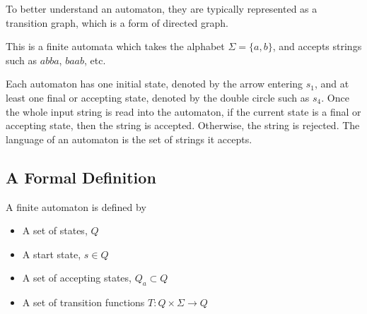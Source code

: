 To better understand an automaton, they are typically represented as a transition graph, which is a form of directed
 graph.

\begin{example*}{}{}
  \centering

  This is a finite automata which takes the alphabet $\Sigma = \{a, b\}$, and accepts strings such as $abba$, $baab$, etc.
\end{example*}

Each automaton has one initial state, denoted by the arrow entering $s_1$, and at least one final or accepting state,
 denoted by the double circle such as $s_4$. Once the whole input string is read into the automaton, if the current
 state is a final or accepting state, then the string is accepted. Otherwise, the string is rejected. The language of
 an automaton is the set of strings it accepts.

\subsection*{A Formal Definition}

\begin{definition*}{}{}
  A finite automaton is defined by
  \begin{itemize}
    \item A set of states, $Q$
    \item A start state, $s \in Q$
    \item A set of accepting states, $Q_a \subset Q$
    \item A set of transition functions $T : Q \times \Sigma \rightarrow Q$
  \end{itemize}
\end{definition*}


